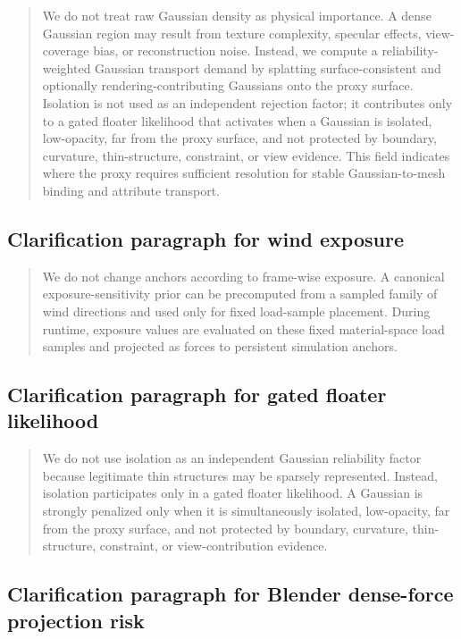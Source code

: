 \documentclass[11pt,a4paper]{article}
\begin{document}
\begin{quote}
We do not treat raw Gaussian density as physical importance. A dense Gaussian region may result from texture complexity, specular effects, view-coverage bias, or reconstruction noise. Instead, we compute a reliability-weighted Gaussian transport demand by splatting surface-consistent and optionally rendering-contributing Gaussians onto the proxy surface. Isolation is not used as an independent rejection factor; it contributes only to a gated floater likelihood that activates when a Gaussian is isolated, low-opacity, far from the proxy surface, and not protected by boundary, curvature, thin-structure, constraint, or view evidence. This field indicates where the proxy requires sufficient resolution for stable Gaussian-to-mesh binding and attribute transport.
\end{quote}

\subsection{Clarification paragraph for wind exposure}

\begin{quote}
We do not change anchors according to frame-wise exposure. A canonical exposure-sensitivity prior can be precomputed from a sampled family of wind directions and used only for fixed load-sample placement. During runtime, exposure values are evaluated on these fixed material-space load samples and projected as forces to persistent simulation anchors.
\end{quote}

\subsection{Clarification paragraph for gated floater likelihood}

\begin{quote}
We do not use isolation as an independent Gaussian reliability factor because legitimate thin structures may be sparsely represented. Instead, isolation participates only in a gated floater likelihood. A Gaussian is strongly penalized only when it is simultaneously isolated, low-opacity, far from the proxy surface, and not protected by boundary, curvature, thin-structure, constraint, or view-contribution evidence.
\end{quote}

\subsection{Clarification paragraph for Blender dense-force projection risk}
\end{document}
